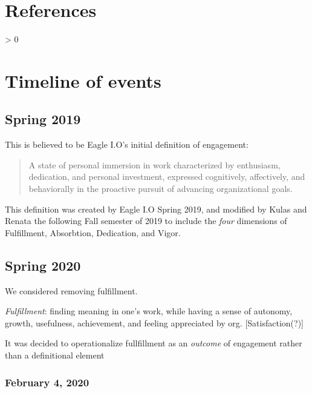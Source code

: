 \documentclass[
]{book}
\newlength{\cslhangindent}
\newenvironment{CSLReferences}[2] %
 {%
  \setlength{\parindent}{0pt}
  \ifodd #1 \everypar{\setlength{\hangindent}{\cslhangindent}}\ignorespaces\fi
  \ifnum #2 > 0
  \setlength{\parskip}{#2\baselineskip}
  \fi
 }%
 {}
\begin{document}
\hypertarget{references}{%
\chapter{References}\label{references}}

\hypertarget{refs}{}
\begin{CSLReferences}{0}{0}
\end{CSLReferences}

\hypertarget{appendix-appendices}{%
\appendix}


\hypertarget{timeline}{%
\chapter{Timeline of events}\label{timeline}}

\hypertarget{spring-2019}{%
\section{Spring 2019}\label{spring-2019}}

This is believed to be Eagle I.O's initial definition of engagement:

\begin{quote}
A state of personal immersion in work characterized by enthusiasm, dedication, and personal investment, expressed cognitively, affectively, and behaviorally in the proactive pursuit of advancing organizational goals.
\end{quote}

This definition was created by Eagle I.O Spring 2019, and modified by Kulas and Renata the following Fall semester of 2019 to include the \emph{four} dimensions of Fulfillment, Absorbtion, Dedication, and Vigor.

\hypertarget{spring-2020}{%
\section{Spring 2020}\label{spring-2020}}

We considered removing fulfillment.

\emph{Fulfillment}: finding meaning in one's work, while having a sense of autonomy, growth, usefulness, achievement, and feeling appreciated by org. {[}Satisfaction(?){]}

It was decided to operationalize fullfillment as an \emph{outcome} of engagement rather than a definitional element

\hypertarget{february-4-2020}{%
\subsection{February 4, 2020}\label{february-4-2020}}
\end{document}
